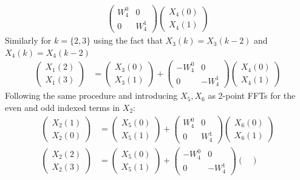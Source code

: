 \documentclass[journal,12pt,twocolumn]{IEEEtran}
\renewcommand\thesection{\arabic{section}}
\begin{document}
\begin{enumerate}[label=\arabic*.,ref=\thesection.\theenumi]
\begin{align}
\begin{pmatrix}
W_4^0&0\\0&W_4^1
\end{pmatrix}\begin{pmatrix}
X_4(0)\\
X_4(1)
\end{pmatrix}\label{eq:fft1}
\end{align}
Similarly for $k=\{2,3\}$ using the fact that $X_3(k)=X_3(k-2)$ and $X_4(k)=X_4(k-2)$
\begin{align}
   \begin{pmatrix}
X_1(2)\\X_1(3)
\end{pmatrix} &= \begin{pmatrix}
X_3(0)\\X_3(1)
\end{pmatrix}+\begin{pmatrix}
-W_4^0&0\\0&-W_4^1
\end{pmatrix}\begin{pmatrix}
X_4(0)\\
X_4(1)
\end{pmatrix}\label{eq:fft2}
\end{align}
Following the same procedure and introducing $X_5,X_6$ as 2-point FFTs for the even and odd indexed terms in $X_2$:
\begin{align}
       \begin{pmatrix}
X_2(1)\\X_2(0)
\end{pmatrix} &= \begin{pmatrix}
X_5(0)\\X_5(1)
\end{pmatrix}+\begin{pmatrix}
W_4^0&0\\0&W_4^1
\end{pmatrix}\begin{pmatrix}
X_6(0)\\
X_6(1)
\end{pmatrix}\label{eq:fft3}\\
   \begin{pmatrix}
X_2(2)\\X_2(3)
\end{pmatrix} &= \begin{pmatrix}
X_5(0)\\X_5(1)
\end{pmatrix}+\begin{pmatrix}
-W_4^0&0\\0&-W_4^1
\end{pmatrix}\begin{pmatrix}

\end{pmatrix}
\end{align}
\end{enumerate}
\end{document}
